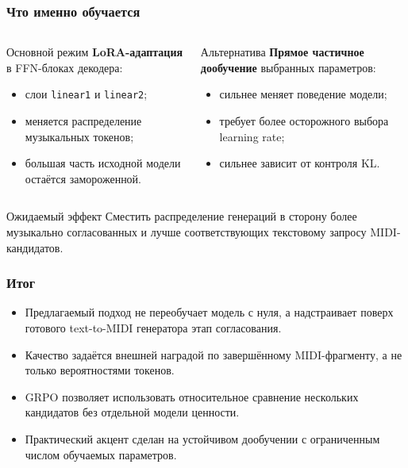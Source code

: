 \documentclass[aspectratio=169]{beamer}
\begin{document}
\begin{frame}
\frametitle{Что именно обучается}
\begin{columns}
\begin{block}{Основной режим}
\textbf{LoRA-адаптация} в FFN-блоках декодера:
\begin{itemize}
    \item слои \texttt{linear1} и \texttt{linear2};
    \item меняется распределение музыкальных токенов;
    \item большая часть исходной модели остаётся замороженной.
\end{itemize}
\end{block}

\begin{block}{Альтернатива}
\textbf{Прямое частичное дообучение} выбранных параметров:
\begin{itemize}
    \item сильнее меняет поведение модели;
    \item требует более осторожного выбора learning rate;
    \item сильнее зависит от контроля KL.
\end{itemize}
\end{block}
\end{columns}

\begin{exampleblock}{Ожидаемый эффект}
Сместить распределение генераций в сторону более музыкально согласованных и лучше соответствующих текстовому запросу MIDI-кандидатов.
\end{exampleblock}
\end{frame}

\begin{frame}
\frametitle{Итог}
\begin{itemize}
    \item Предлагаемый подход не переобучает модель с нуля, а надстраивает поверх готового text-to-MIDI генератора этап согласования.
    \item Качество задаётся внешней наградой по завершённому MIDI-фрагменту, а не только вероятностями токенов.
    \item GRPO позволяет использовать относительное сравнение нескольких кандидатов без отдельной модели ценности.
    \item Практический акцент сделан на устойчивом дообучении с ограниченным числом обучаемых параметров.
\end{itemize}
\end{frame}
\end{document}
